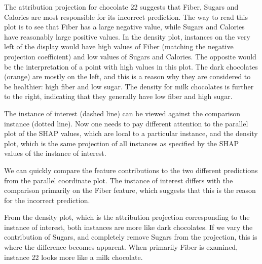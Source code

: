 \documentclass[
]{article}
\begin{document}
The attribution projection for chocolate 22 suggests that Fiber, Sugars and Calories are most responsible for its incorrect prediction. The way to read this plot is to see that Fiber has a large negative value, while Sugars and Calories have reasonably large positive values. In the density plot, instances on the very left of the display would have high values of Fiber (matching the negative projection coefficient) and low values of Sugars and Calories. The opposite would be the interpretation of a point with high values in this plot. The dark chocolates (orange) are mostly on the left, and this is a reason why they are considered to be healthier: high fiber and low sugar. The density for milk chocolates is further to the right, indicating that they generally have low fiber and high sugar.

The instance of interest (dashed line) can be viewed against the comparison instance (dotted line). Now one needs to pay different attention to the parallel plot of the SHAP values, which are local to a particular instance, and the density plot, which is the same projection of all instances as specified by the SHAP values of the instance of interest.

We can quickly compare the feature contributions to the two different predictions from the parallel coordinate plot. The instance of interest differs with the comparison primarily on the Fiber feature, which suggests that this is the reason for the incorrect prediction.

From the density plot, which is the attribution projection corresponding to the instance of interest, both instances are more like dark chocolates. If we vary the contribution of Sugars, and completely remove Sugars from the projection, this is where the difference becomes apparent. When primarily Fiber is examined, instance 22 looks more like a milk chocolate.
\end{document}
